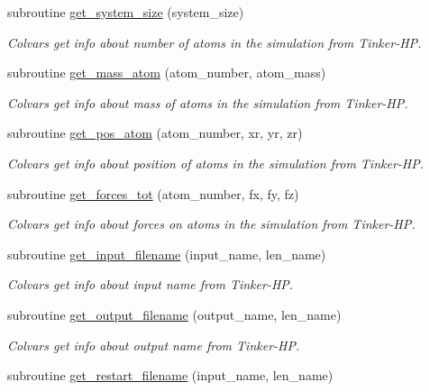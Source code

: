 \begin{DoxyCompactItemize}
subroutine \hyperlink{MOD__colvars_8f90_a37270764f8aaa064a94d33f14a781301}{get\-\_\-system\-\_\-size} (system\-\_\-size)
\begin{DoxyCompactList}\small\item\em Colvars get info about number of atoms in the simulation from Tinker-\/\-H\-P. \end{DoxyCompactList}\item 
subroutine \hyperlink{MOD__colvars_8f90_a7190f55bfadbd459141053335fdc1618}{get\-\_\-mass\-\_\-atom} (atom\-\_\-number, atom\-\_\-mass)
\begin{DoxyCompactList}\small\item\em Colvars get info about mass of atoms in the simulation from Tinker-\/\-H\-P. \end{DoxyCompactList}\item 
subroutine \hyperlink{MOD__colvars_8f90_a550ca5ceb669a6edc2c1e953a264816a}{get\-\_\-pos\-\_\-atom} (atom\-\_\-number, xr, yr, zr)
\begin{DoxyCompactList}\small\item\em Colvars get info about position of atoms in the simulation from Tinker-\/\-H\-P. \end{DoxyCompactList}\item 
subroutine \hyperlink{MOD__colvars_8f90_a8444d376a2352cba5567b6531370bfe9}{get\-\_\-forces\-\_\-tot} (atom\-\_\-number, fx, fy, fz)
\begin{DoxyCompactList}\small\item\em Colvars get info about forces on atoms in the simulation from Tinker-\/\-H\-P. \end{DoxyCompactList}\item 
subroutine \hyperlink{MOD__colvars_8f90_a4a512acda1bb40d347d9c1ad2e60c9d6}{get\-\_\-input\-\_\-filename} (input\-\_\-name, len\-\_\-name)
\begin{DoxyCompactList}\small\item\em Colvars get info about input name from Tinker-\/\-H\-P. \end{DoxyCompactList}\item 
subroutine \hyperlink{MOD__colvars_8f90_a6f06809d988e61f9ad47ee4f2cf52c82}{get\-\_\-output\-\_\-filename} (output\-\_\-name, len\-\_\-name)
\begin{DoxyCompactList}\small\item\em Colvars get info about output name from Tinker-\/\-H\-P. \end{DoxyCompactList}\item 
subroutine \hyperlink{MOD__colvars_8f90_a83538702927aba667f8a5eeb62591621}{get\-\_\-restart\-\_\-filename} (input\-\_\-name, len\-\_\-name)

\end{DoxyCompactItemize}
